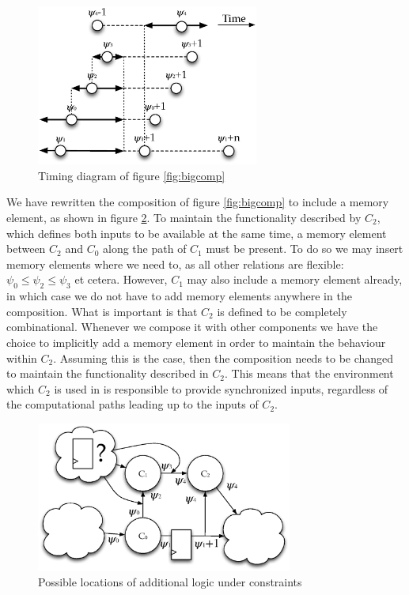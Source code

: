 \begin{figure}[h]
\centering
\includegraphics[width=0.65\textwidth]{images/bigcomptiming}
\caption{Timing diagram of figure \ref{fig:bigcomp}} \label{fig:bigcomptiming}
\end{figure}


We have rewritten the composition of figure \ref{fig:bigcomp} to include a memory element, as shown in figure \ref{fig:bigcomprewritten}.
To maintain the functionality described by $C_2$, which defines both inputs to be available at the same time, a memory element between $C_2$ and $C_0$ along the path of $C_1$ must be present.
To do so we may insert memory elements where we need to, as all other relations are flexible: $\psi_0 \le \psi_2 \le \psi_3$ et cetera.
However, $C_1$ may also include a memory element already, in which case we do not have to add memory elements anywhere in the composition.
What is important is that $C_2$ is defined to be completely combinational.
Whenever we compose it with other components we have the choice to implicitly add a memory element in order to maintain the behaviour within $C_2$.
Assuming this is the case, then the composition needs to be changed to maintain the functionality described in $C_2$.
This means that the environment which $C_2$ is used in is responsible to provide synchronized inputs, regardless of the computational paths leading up to the inputs of $C_2$.

\begin{figure}[h]
\centering
\includegraphics[width=0.75\textwidth]{images/bigcomprewritten}
\caption{Possible locations of additional logic under constraints} \label{fig:bigcomprewritten}
\end{figure}

